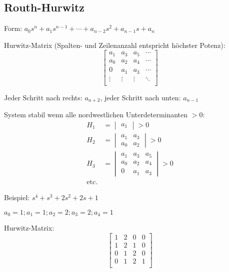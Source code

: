 \documentclass[11pt,a4paper,fleqn,headsepline]{scrreprt}
\begin{document}
    \begin{multicols}{2}

\renewcommand{\cleardoublepage}{}
\renewcommand{\clearpage}{}

        \section*{Routh-Hurwitz}
        Form: \(a_0 s^n + a_1 s^{n-1} + \cdots + a_{n-2} s^2 + a_{n-1} s + a_n\)

        Hurwitz-Matrix (Spalten- und Zeilenanzahl entspricht höchster Potenz):
        \[\begin{bmatrix}
            a_1 & a_3 & a_5 & \cdots \\
            a_0 & a_2 & a_4 & \cdots \\
            0 & a_1 & a_3 & \cdots \\
            \vdots & \vdots & \vdots & \ddots \\
        \end{bmatrix}\]

        Jeder Schritt nach rechts: \(a_{n+2}\), jeder Schritt nach unten: \(a_{n-1}\)

        System stabil wenn alle nordwestlichen Unterdeterminanten \(>0\):
        \begin{align*}
            H_1 &= \begin{vmatrix} a_1 \end{vmatrix} > 0 \\
            H_2 &= \begin{vmatrix} a_1 & a_3 \\ a_0 & a_2 \end{vmatrix} > 0 \\
            H_3 &= \begin{vmatrix} a_1 & a_3 & a_5 \\ a_0 & a_2 & a_4 \\ 0 & a_1 & a_3 \end{vmatrix} > 0 \\
            \text{etc.}
        \end{align*}

        Beispiel: \(s^4+s^3+2s^2+2s+1\)

        \(a_0 = 1; a_1 = 1; a_2 = 2; a_3 = 2; a_4 = 1\)

        Hurwitz-Matrix:
        \[\begin{bmatrix}
            1 & 2 & 0 & 0 \\
            1 & 2 & 1 & 0 \\
            0 & 1 & 2 & 0 \\
            0 & 1 & 2 & 1 \\
        \end{bmatrix}\]


\end{multicols}
\end{document}
